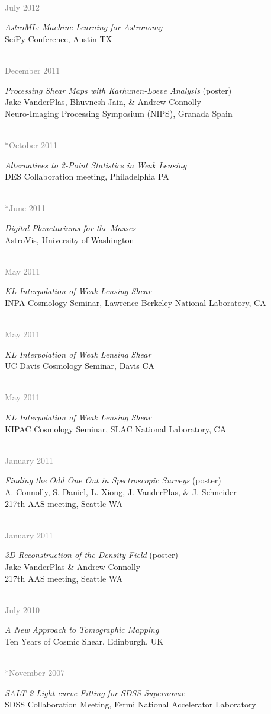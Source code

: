 \documentclass{article} %
\newlength\sidebarwidth
\newcommand{\dateonly}[2][]
	 {\begin{minipage}{\textwidth}
	 \vspace*{.4\baselineskip}
         \nopagebreak\hspace{0in}%
         \nopagebreak\begin{minipage}[t]{\sidebarwidth - .2cm}
         \raggedleft {~}
         {\\[-\baselineskip] \textcolor{gray}{\footnotesize #1}}
	 \end{minipage}%
	 \hfill
	 \begin{minipage}[t]{\linewidth - \sidebarwidth}
	 #2%
	 \end{minipage}%
	 \vspace*{.2\baselineskip plus 1\baselineskip minus
	 .2\baselineskip}%
	 \end{minipage}}
\begin{document}
  \dateonly[July 2012]{
    {\it AstroML: Machine Learning for Astronomy}\\
    SciPy Conference, Austin TX
  }

  \dateonly[December 2011]{
    {\it Processing Shear Maps with Karhunen-Loeve Analysis} (poster)\\
    Jake VanderPlas, Bhuvnesh Jain, \& Andrew Connolly\\
    Neuro-Imaging Processing Symposium (NIPS), Granada Spain
  }

  \dateonly[**October 2011]{
    {\it Alternatives to 2-Point Statistics in Weak Lensing}\\
    DES Collaboration meeting, Philadelphia PA
  }

  \dateonly[**June 2011]{
    {\it Digital Planetariums for the Masses}\\
    AstroVis, University of Washington
  }

  \dateonly[May 2011]{
    {\it KL Interpolation of Weak Lensing Shear}\\
    INPA Cosmology Seminar, Lawrence Berkeley National Laboratory, CA
  }

  \dateonly[May 2011]{
    {\it KL Interpolation of Weak Lensing Shear}\\
    UC Davis Cosmology Seminar, Davis CA
  }

  \dateonly[May 2011]{
    {\it KL Interpolation of Weak Lensing Shear}\\
    KIPAC Cosmology Seminar, SLAC National Laboratory, CA
  }

  \dateonly[January 2011]{
    {\it Finding the Odd One Out in Spectroscopic Surveys} (poster)\\
    A. Connolly, S. Daniel, L. Xiong, J. VanderPlas, \& J. Schneider\\
    217th AAS meeting, Seattle WA
  }

  \dateonly[January 2011]{
    {\it 3D Reconstruction of the Density Field} (poster)\\
    Jake VanderPlas \& Andrew Connolly\\
    217th AAS meeting, Seattle WA
  }

  \dateonly[July 2010]{
    {\it A New Approach to Tomographic Mapping}\\
    Ten Years of Cosmic Shear, Edinburgh, UK
  }

  \dateonly[**November 2007]{
    {\it SALT-2 Light-curve Fitting for SDSS Supernovae}\\
    SDSS Collaboration Meeting, Fermi National Accelerator Laboratory
  }
\end{document}
